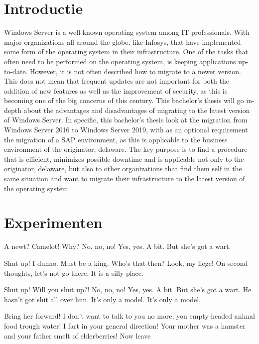 \documentclass[a0,portrait]{a0poster}
\begin{document}
\begin{multicols}{2}
\section*{Introductie}
\color{black}
\color{black}
Windows Server is a well-known operating system among IT professionals. With major organizations all around the globe, like Infosys, that have implemented some form of the operating system in their infrastructure.
One of the tasks that often need to be performed on the operating system, is keeping applications up-to-date. 
However, it is not often described how to migrate to a newer version.  
This does not mean that frequent updates are not important for both the addition of new features as well as the improvement of security, as this is becoming one of the big concerns of this century. 
This bachelor's thesis will go in-depth about the advantages and disadvantages of migrating to the latest version of Windows Server.
In specific, this bachelor's thesis look at the migration from Windows Server 2016 to Windows Server 2019, with as an optional requirement the migration of a SAP environment, as this is applicable to the business environment of the originator, delaware.
The key purpose is to find a procedure that is efficient, minimizes possible downtime and is applicable not only to the originator, delaware, but also to other organizations that find them self in the same situation and want to migrate their infrastructure to the latest version of the operating system.

\color{Black} %
\color{HoGentAccent1} 
\section*{Experimenten}
\color{black}
A newt? Camelot! Why? No, no, no! Yes, yes. A bit. But she's got a wart.

Shut up! I dunno. Must be a king. Who's that then? Look, my liege! On second thoughts, let's not go there. It is a silly place.

Shut up! Will you shut up?! No, no, no! Yes, yes. A bit. But she's got a wart. He hasn't got shit all over him. It's only a model. It's only a model.

Bring her forward! I don't want to talk to you no more, you empty-headed animal food trough water! I fart in your general direction! Your mother was a hamster and your father smelt of elderberries! Now leave 




\end{multicols}
\end{document}
